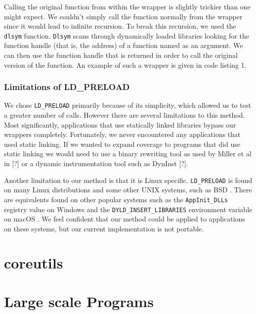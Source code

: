 \documentclass[10pt]{article}
\begin{document}
Calling the original function from within the wrapper is slightly trickier than one might expect. We couldn't simply call the function normally from the wrapper since it would lead to infinite recursion. To break this recursion, we used the \texttt{dlsym} function. \texttt{Dlsym} scans through dynamically loaded libraries looking for the function handle (that is, the address) of a function named as an argument. We can then use the function handle that is returned in order to call the original version of the function. An example of such a wrapper is given in code listing 1.

\begin{minipage}{\linewidth} %
	
\end{minipage}

\subsubsection{Limitations of LD\_PRELOAD}
We chose \texttt{LD\_PRELOAD} primarily because of its simplicity, which allowed us to test a greater number of calls. However there are several limitations to this method. Most significantly, applications that use statically linked libraries bypass our wrappers completely. Fortunately, we never encountered any applications that used static linking. If we wanted to expand coverage to programs that did use static linking we would need to use a binary rewriting tool as used by Miller et al in [?] or a dynamic instrumentation tool such as DynInst [?].

Another limitation to our method is that it is Linux specific. \texttt{LD\_PRELOAD} is found on many Linux distributions and some other UNIX systems, such as BSD \cite{bsd}. There are equivalents found on other popular systems such as the \texttt{AppInit\_DLLs} registry value on Windows \cite{dll} and the \texttt{DYLD\_INSERT\_LIBRARIES} environment variable on macOS \cite{macos}. We feel confident that our method could be applied to applications on these systems, but our current implementation is not portable.

\section{coreutils}

\section{Large scale Programs}
\end{document}
